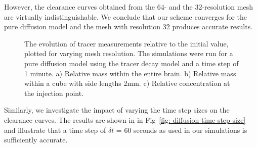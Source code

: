 \documentclass[10pt]{article}
\newcommand{\1}{^{(1)}}
\newcommand{\2}{^{(2)}}
\begin{document}
However, the clearance curves obtained from the 64- and the 32-resolution mesh are virtually indistinguishable.
We conclude that our scheme converges for the pure diffusion model and the mesh with resolution 32 produces accurate results. 
\begin{figure}
    \centering
    \caption{The evolution of tracer measurements relative to the initial value, plotted for varying mesh resolution. The simulations were run for a pure diffusion model using the tracer decay model and a time step of 1 minute. a) Relative mass within the entire brain. b) Relative mass within a cube with side lengths 2mm. c) Relative concentration at the injection point.}
    \label{fig: diffusion mesh resolution}
\end{figure}

Similarly, we investigate the impact of varying the time step sizes on the clearance curves. The results are shown in  in Fig~\ref{fig: diffusion time step size} and illustrate that a time step of $\delta t$ = 60 seconds as used in our simulations is sufficiently accurate.
\end{document}
